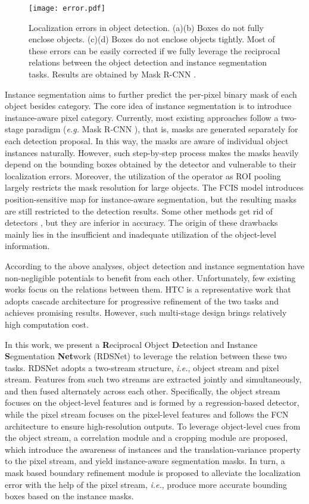 \documentclass[letterpaper]{article} \usepackage{aaai20}  \usepackage{times}  \usepackage{helvet} \usepackage{courier}  \usepackage[hyphens]{url}  \usepackage{graphicx} \urlstyle{rm} \def\UrlFont{\rm}  \usepackage{graphicx}  \frenchspacing  \setlength{\pdfpagewidth}{8.5in}  \setlength{\pdfpageheight}{11in}
\newcommand{\ie}{\textit{i.e.}}
\begin{document}
\begin{figure}[t]
	\centering
	\texttt{[image: error.pdf]}
	\caption{Localization errors in object detection. (a)(b) Boxes do not fully enclose objects. (c)(d) Boxes do not enclose objects tightly. Most of these errors can be easily corrected if we fully leverage the reciprocal relations between the object detection and instance segmentation tasks. Results are obtained by Mask R-CNN \cite{he2017mask}.}
	\label{fig:error}
\end{figure}

Instance segmentation aims to further predict the per-pixel binary mask of each object besides category. The core idea of instance segmentation is to introduce instance-aware pixel category. Currently, most existing approaches follow a two-stage  paradigm (\textit{e.g.} Mask R-CNN \cite{he2017mask}), that is, masks are generated separately for each detection proposal. In this way, the masks are aware of individual object instances naturally. However, such step-by-step process makes the masks heavily depend on the bounding boxes obtained by the detector and vulnerable to their localization errors. Moreover, the utilization of the operator as ROI pooling \cite{girshick2015fast} largely restricts the mask resolution for large objects. The FCIS model \cite{li2017fully} introduces position-sensitive map for instance-aware segmentation, but the resulting masks are still restricted to the detection results. Some other methods get rid of detectors \cite{fathi2017semantic} , but they are inferior in accuracy. The origin of these drawbacks mainly lies in the insufficient and inadequate utilization of the object-level information.

According to the above analyses, object detection and instance segmentation have non-negligible potentials to benefit from each other. Unfortunately, few existing works focus on the relations between them. HTC \cite{chen2019hybrid} is a representative work that adopts cascade architecture for progressive refinement of the two tasks and achieves promising results. However, such multi-stage design brings relatively high computation cost.

In this work, we present a \textbf{R}eciprocal Object \textbf{D}etection and Instance \textbf{S}egmentation \textbf{Net}work (RDSNet) to leverage the relation between these two tasks. RDSNet adopts a two-stream structure, \ie, object stream and pixel stream. Features from such two streams are extracted jointly and simultaneously, and then fused alternately across each other. Specifically, the object stream focuses on the object-level features and is formed by  a regression-based detector, while the pixel stream focuses on the pixel-level features and follows the FCN \cite{long2015fully} architecture to ensure high-resolution outputs. To leverage object-level cues from the object stream, a correlation module and a cropping module are proposed, which introduce the awareness of instances and the translation-variance property to the pixel stream, and yield instance-aware segmentation masks. In turn, a mask based boundary refinement module is proposed to alleviate the localization error with the help of the pixel stream, \ie, produce more accurate bounding boxes based on the instance masks.
\end{document}
